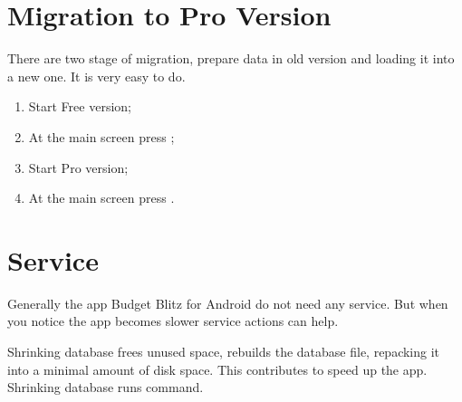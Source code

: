 \documentclass[a4paper,10pt,english]{sphinxmanual}
\begin{document}


\chapter{Migration to Pro Version}
\label{\detokenize{migration-to-pro:migration-to-pro-version}}\label{\detokenize{migration-to-pro:chapter-migration-to-pro}}\label{\detokenize{migration-to-pro::doc}}
There are two stage of migration, prepare data in old version and loading it into a new one.
It is very easy to do.
\begin{enumerate}
\def\theenumi{\arabic{enumi}}
\def\labelenumi{\theenumi .}
\makeatletter\def\p@enumii{\p@enumi \theenumi .}\makeatother
\item {} 
Start Free version;

\item {} 
At the main screen press ;

\item {} 
Start Pro version;

\item {} 
At the main screen press .

\end{enumerate}


\chapter{Service}
\label{\detokenize{service:service}}\label{\detokenize{service:chapter-service}}\label{\detokenize{service::doc}}
Generally the app Budget Blitz for Android do not need any service. But when you notice
the app becomes slower service actions can help.

\noindent{}

\noindent{}

\noindent{}

Shrinking database frees unused space, rebuilds the database file, repacking it into a minimal
amount of disk space. This contributes to speed up the app. Shrinking database runs
 command.
\end{document}
